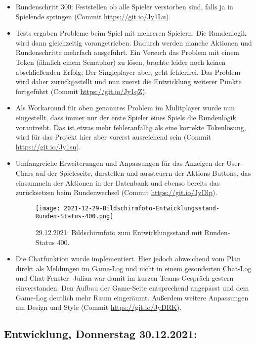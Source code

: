\begin{itemize}
    \item Rundenschritt 300: Feststellen ob alle Spieler verstorben sind, falls ja in Spielende springen (Commit \url{https://git.io/Jy1Lu}).
    \item Tests ergaben Probleme beim Spiel mit mehreren Spielern. Die Rundenlogik wird dann gleichzeitig vorangetrieben. Dadurch werden manche Aktionen und Rundenschritte mehrfach ausgeführt. Ein Versuch das Problem mit einem Token (ähnlich einem Semaphor) zu lösen, brachte leider noch keinen abschließenden Erfolg. Der Singleplayer aber, geht fehlerfrei. Das Problem wird daher zurückgestellt und nun zuerst die Entwicklung weiterer Punkte fortgeführt (Commit \url{https://git.io/Jy1qZ}).
    \item Als Workaround für oben genanntes Problem im Mulitplayer wurde nun eingestellt, dass immer nur der erste Spieler eines Spiels die Rundenlogik vorantreibt. Das ist etwas mehr fehleranfällig als eine korrekte Tokenlösung, wird für das Projekt hier aber vorerst ausreichend sein (Commit \url{https://git.io/Jy1su}).
    \item Umfangreiche Erweiterungen und Anpassungen für das Anzeigen der User-Chars auf der Spieleseite, darstellen und aussteuern der Aktions-Buttons, das einsammeln der Aktionen in der Datenbank und ebenso bereits das zurücksetzen beim Rundenwechsel (Commit \url{https://git.io/JyDlp}).

    \begin{figure}[H]
        \centering
        \caption[]{29.12.2021: Bildschirmfoto zum Entwicklungsstand mit Runden-Status 400.}
        \label{fig:2021-12-29-Bildschirmfoto-Entwicklungsstand-Runden-Status-400.png}
        \texttt{[image: 2021-12-29-Bildschirmfoto-Entwicklungsstand-Runden-Status-400.png]}
    \end{figure}

    \item Die Chatfunktion wurde implementiert. Hier jedoch abweichend vom Plan direkt als Meldungen im Game-Log und nicht in einem gesonderten Chat-Log und Chat-Fenster. Julian war damit im kurzen Teams-Gespräch gestern einverstanden. Den Aufbau der Game-Seite entsprechend angepasst und dem Game-Log deutlich mehr Raum eingeräumt. Außerdem weitere Anpassungen am Design und Style (Commit \url{https://git.io/JyDRK}).

\end{itemize}


\subsection{Entwicklung, Donnerstag 30.12.2021:}

